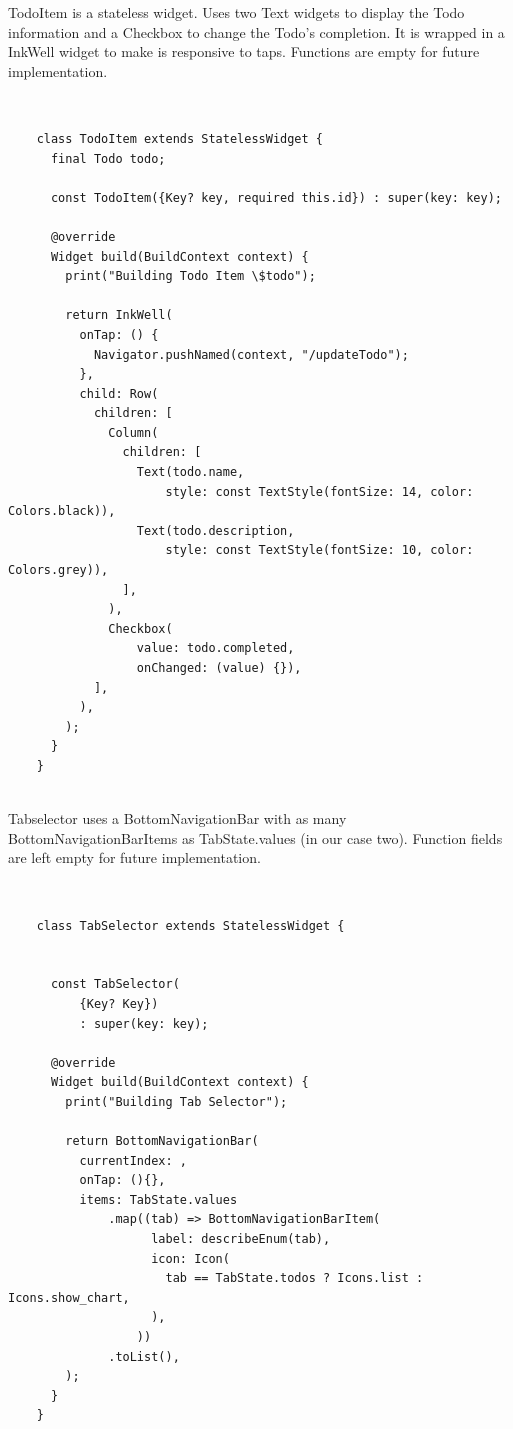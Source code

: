 	\mbox{}
	
	
	TodoItem is a stateless widget. Uses two Text widgets to display the Todo information and a Checkbox to change the Todo’s completion. It is wrapped in a InkWell widget to make is responsive to taps. Functions are empty for future implementation.
	
	\mbox{}\\
	
	 \mbox{}
	\begin{verbatim}
	class TodoItem extends StatelessWidget {
	  final Todo todo;
	
	  const TodoItem({Key? key, required this.id}) : super(key: key);
	
	  @override
	  Widget build(BuildContext context) {
	    print("Building Todo Item \$todo");
	
	    return InkWell(
	      onTap: () {
	        Navigator.pushNamed(context, "/updateTodo");
	      },
	      child: Row(
	        children: [
	          Column(
	            children: [
	              Text(todo.name,
	                  style: const TextStyle(fontSize: 14, color: Colors.black)),
	              Text(todo.description,
	                  style: const TextStyle(fontSize: 10, color: Colors.grey)),
	            ],
	          ),
	          Checkbox(
	              value: todo.completed,
	              onChanged: (value) {}),
	        ],
	      ),
	    );
	  }
	}
	
	\end{verbatim}
	
	\mbox{}
	
	
	Tabselector uses a BottomNavigationBar with as many BottomNavigationBarItems as TabState.values (in our case two). Function fields are left empty for future implementation.
	
	\mbox{}\\
	
	 \mbox{}
	\begin{verbatim}
	class TabSelector extends StatelessWidget {
	
	
	  const TabSelector(
	      {Key? Key})
	      : super(key: key);
	
	  @override
	  Widget build(BuildContext context) {
	    print("Building Tab Selector");
	
	    return BottomNavigationBar(
	      currentIndex: ,
	      onTap: (){},
	      items: TabState.values
	          .map((tab) => BottomNavigationBarItem(
	                label: describeEnum(tab),
	                icon: Icon(
	                  tab == TabState.todos ? Icons.list : Icons.show_chart,
	                ),
	              ))
	          .toList(),
	    );
	  }
	}
	
	\end{verbatim}
	
